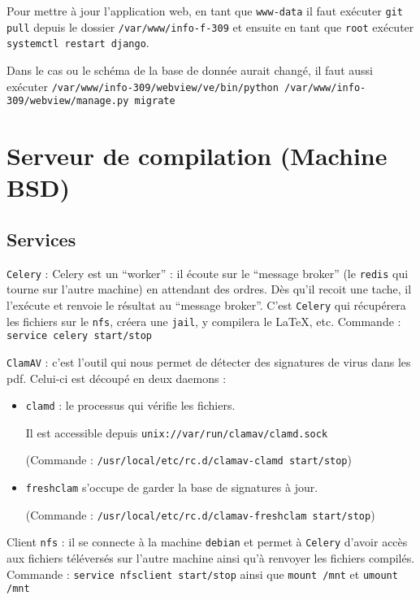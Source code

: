 \documentclass[10pt,a4paper]{article}
\begin{document}
Pour mettre à jour l'application web, en tant que \texttt{www-data}
il faut exécuter \texttt{git pull} depuis le dossier \texttt{/var/www/info-f-309}
et ensuite en tant que \texttt{root} exécuter \texttt{systemctl restart django}.

Dans le cas ou le schéma de la base de donnée aurait changé,
il faut aussi exécuter \texttt{/var/www/info-309/webview/ve/bin/python /var/www/info-309/webview/manage.py migrate}

\section{Serveur de compilation (Machine BSD)}
\subsection{Services}

\texttt{Celery} : Celery est un ``worker'' : il écoute sur le ``message broker'' (le \texttt{redis} qui tourne sur l'autre machine) en attendant des ordres.
Dès qu'il recoit une tache, il l'exécute et renvoie le résultat au ``message broker''.
C'est \texttt{Celery} qui récupérera les fichiers sur le \texttt{nfs}, créera une \texttt{jail}, y compilera le \LaTeX, etc.
Commande : \texttt{service celery start/stop}

\texttt{ClamAV} : c'est l'outil qui nous permet de détecter des signatures de virus dans les pdf.
Celui-ci est découpé en deux daemons :
        \begin{itemize}
            \item \texttt{clamd} : le processus qui vérifie les fichiers.

            Il est accessible depuis \texttt{unix://var/run/clamav/clamd.sock}

            (Commande : \texttt{/usr/local/etc/rc.d/clamav-clamd start/stop})
            \item \texttt{freshclam} s'occupe de garder la base de signatures à jour.

            (Commande : \texttt{/usr/local/etc/rc.d/clamav-freshclam start/stop})
        \end{itemize}

\vspace{1em} %
Client \texttt{nfs} : il se connecte à la machine \texttt{debian} et permet à \texttt{Celery} d'avoir accès aux fichiers téléversés sur l'autre machine ainsi qu'à renvoyer les fichiers compilés.
Commande : \texttt{service nfsclient start/stop} ainsi que \texttt{mount /mnt} et \texttt{umount /mnt}
\end{document}
